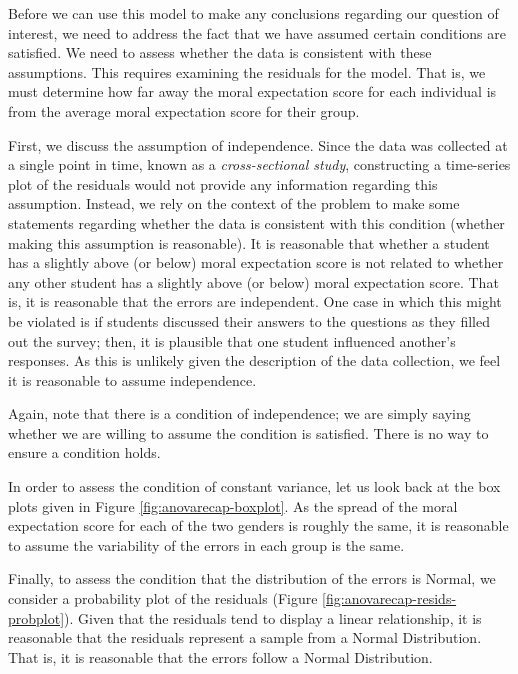 \documentclass[]{book}
\theoremstyle{definition}
\theoremstyle{definition}
\theoremstyle{remark}
\begin{document}
Before we can use this model to make any conclusions regarding our
question of interest, we need to address the fact that we have assumed
certain conditions are satisfied. We need to assess whether the data is
consistent with these assumptions. This requires examining the residuals
for the model. That is, we must determine how far away the moral
expectation score for each individual is from the average moral
expectation score for their group.

First, we discuss the assumption of independence. Since the data was
collected at a single point in time, known as a \emph{cross-sectional
study}, constructing a time-series plot of the residuals would not
provide any information regarding this assumption. Instead, we rely on
the context of the problem to make some statements regarding whether the
data is consistent with this condition (whether making this assumption
is reasonable). It is reasonable that whether a student has a slightly
above (or below) moral expectation score is not related to whether any
other student has a slightly above (or below) moral expectation score.
That is, it is reasonable that the errors are independent. One case in
which this might be violated is if students discussed their answers to
the questions as they filled out the survey; then, it is plausible that
one student influenced another's responses. As this is unlikely given
the description of the data collection, we feel it is reasonable to
assume independence.

Again, note that there is a condition of independence; we are simply
saying whether we are willing to assume the condition is satisfied.
There is no way to ensure a condition holds.

In order to assess the condition of constant variance, let us look back
at the box plots given in Figure \ref{fig:anovarecap-boxplot}. As the
spread of the moral expectation score for each of the two genders is
roughly the same, it is reasonable to assume the variability of the
errors in each group is the same.

Finally, to assess the condition that the distribution of the errors is
Normal, we consider a probability plot of the residuals (Figure
\ref{fig:anovarecap-resids-probplot}). Given that the residuals tend to
display a linear relationship, it is reasonable that the residuals
represent a sample from a Normal Distribution. That is, it is reasonable
that the errors follow a Normal Distribution.
\end{document}
